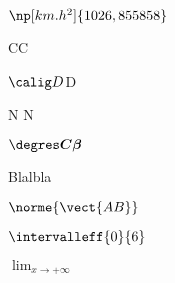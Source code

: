 \documentclass[french,12pt]{book}
\begin{document}
{
}


$\np[km.h^2]{1026,855858}$

\calig C\qquad \mtc C

$\calig D$\qquad \mtc D

\calig N \qquad \mtc N


$\boldsymbol{\degres C \beta}$




Blalbla

$\norme{\vect{AB}}$

$\intervalleff{0}{6}$

$\lim_{x \to +\infty}$
\end{document}
